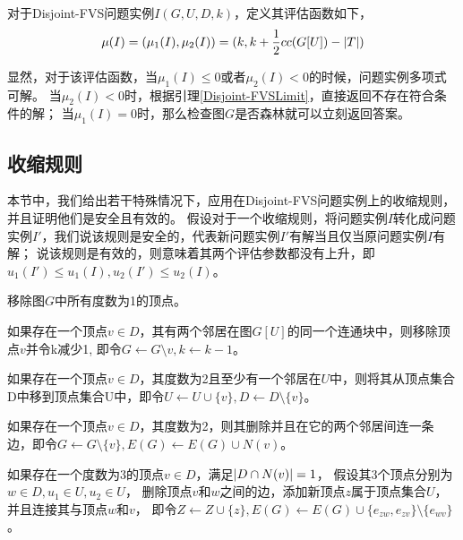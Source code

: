 \begin{definition}
对于Disjoint-FVS问题实例$I(G, U, D, k)$，定义其评估函数如下，
\[\mu(I) = (\mu_1(I), \mu_2(I)) = (k, k + \frac{1}{2}cc(G[U]) - \left\vert T \right\vert)\]
\end{definition}

显然，对于该评估函数，当$\mu_1(I) \le  0$或者$\mu_2(I) < 0$的时候，问题实例多项式可解。
当$\mu_2(I) < 0$时，根据引理\ref{Disjoint-FVSLimit}，直接返回不存在符合条件的解；
当$\mu_1(I) = 0$时，那么检查图$G$是否森林就可以立刻返回答案。

\subsection{收缩规则}
本节中，我们给出若干特殊情况下，应用在Disjoint-FVS问题实例上的收缩规则，并且证明他们是安全且有效的。
假设对于一个收缩规则，将问题实例$I$转化成问题实例$I'$，我们说该规则是安全的，代表新问题实例$I'$有解当且仅当原问题实例$I$有解；
说该规则是有效的，则意味着其两个评估参数都没有上升，即$u_1(I') \le u_1(I), u_2(I') \le u_2(I)$。 \\

\begin{reducerule}
移除图$G$中所有度数为1的顶点。
\end{reducerule}

\begin{reducerule}
如果存在一个顶点$v \in D$，其有两个邻居在图$G[U]$的同一个连通块中，则移除顶点$v$并令k减少1, 即令$G \leftarrow G \setminus v, k \leftarrow k - 1$。
\end{reducerule}

\begin{reducerule}
如果存在一个顶点$v \in D$，其度数为2且至少有一个邻居在$U$中，则将其从顶点集合D中移到顶点集合U中，即令$U \leftarrow U \cup \{v\}, D \leftarrow D \setminus \{v\}$。
\end{reducerule}

\begin{reducerule}
如果存在一个顶点$v \in D$，其度数为2，则其删除并且在它的两个邻居间连一条边，即令$G \leftarrow G \setminus \{v\}, E(G) \leftarrow E(G) \cup N(v)$。
\end{reducerule}


\begin{reducerule}
如果存在一个度数为3的顶点$v \in D$，满足$\left\vert D \cap N(v) \right\vert = 1$，
假设其3个顶点分别为$w \in D, u_1 \in U, u_2 \in U$，
删除顶点$v$和$w$之间的边，添加新顶点$z$属于顶点集合$U$，并且连接其与顶点$w$和$v$，
即令$Z \leftarrow Z \cup \{z\}, E(G) \leftarrow E(G) \cup \{e_{zw}, e_{zv}\} \setminus \{e_{wv}\}$。
\end{reducerule}


